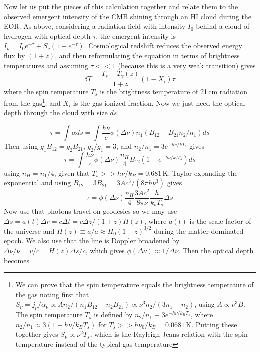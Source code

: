 {Now let us put the pieces of this calculation together and relate them to the observed emergent intensity of the CMB shining through an HI cloud during the EOR. As above, considering a radiation field with intensity $I_0$ behind a cloud of hydrogen with optical depth $\tau$, the emergent intensity is $I_\nu=I_0e^{-\tau}+S_\nu(1-e^{-\tau})$. Cosmological redshift reduces the observed energy flux by $(1+z)$, and then reformulating the equation in terms of brightness temperatures and assuming $\tau<<1$ (because this is a very weak transition) gives
\begin{equation}
\delta T=\frac{T_s-T_\gamma(z)}{1+z} (1-X_i)\tau
\end{equation}
where the spin temperature $T_s$ is the brightness temperature of 21\,cm radiation from the gas\footnote{We can prove that the spin temperature equals the brightness temperature of the gas noting first that $S_\nu=j_\nu/\alpha_\nu\propto A n_2/(n_1B_{12}-n_2B_{21})\propto\nu^3n_2/(3n_1-n_2)$, using $A\propto\nu^3B$. The spin temperature $T_s$ is defined by $n_2/n_1\equiv3e^{-h\nu/k_B T_s}$, where $n_2/n_1\approx3(1-h\nu/k_BT_s)$ for $T_s>>h\nu_0/k_B= 0.0681$\,K. Putting these together gives $S_\nu\propto \nu^2 T_s$, which is the Rayleigh-Jeans relation with the spin temperature instead of the typical gas temperature}, and $X_i$ is the gas ionized fraction. Now we just need the optical depth through the cloud with size $ds$.

\begin{equation}
\tau=\int\alpha ds=\int\frac{h\nu}{c}\phi(\Delta\nu)n_1(B_{12}-B_{21}n_2/n_1)ds
\end{equation}
Then using $g_1B_{12}=g_2B_{21}$, $g_2/g_1=3$, and $n_2/n_1=3e^{-h\nu/kT_s}$ gives
\begin{equation}
\tau=\int\frac{h\nu}{c}\phi(\Delta\nu)\frac{n_H}{4}B_{12}(1-e^{-h\nu/k_bT_s})ds
\end{equation}
using $n_H=n_1/4$, given that $T_s>>h\nu/k_B=0.681$\,K. Taylor expanding the exponential and using $B_{12}=3B_{21}=3Ac^3/(8\pi h\nu^3)$ gives
\begin{equation}
\tau=\phi(\Delta\nu)\frac{n_H}{4}\frac{3Ac^2}{8\pi\nu}\frac{h}{k_bT_s}\Delta s
\end{equation}
Now use that photons travel on geodesics so we may use $\Delta s=a(t)\Delta r=c\Delta t=c\Delta z/(1+z)H(z)$, where $a(t)$ is the scale factor of the universe and $H(z)\equiv \dot{a}/a\approx H_0(1+z)^{3/2}$ during the matter-dominated epoch. We also use that the line is Doppler broadened by $\Delta\nu/\nu=v/c=H(z)\Delta s/c$, which gives $\phi(\Delta\nu)\approx1/\Delta \nu$. Then the optical depth becomes

}

